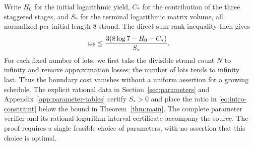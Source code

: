 Write $H_0$ for the initial logarithmic yield, $C_*$ for the contribution
of the three staggered stages, and $S_*$ for the terminal logarithmic
matrix volume, all normalized per initial length-$8$ strand.  The
direct-sum rank inequality then gives
\begin{equation}\label{eq:intro-constraint}
 \omega_\F\leq\frac{3(8\log7-H_0-C_*)}{S_*}.
\end{equation}
For each fixed number of lots, we first take the divisible strand count
$N$ to infinity and remove approximation losses; the number of lots
tends to infinity last.  Thus the boundary cost vanishes without a
uniform assertion for a growing schedule.  The explicit rational data
in Section~\ref{sec:parameters} and Appendix~\ref{app:parameter-tables}
certify $S_*>0$ and place the ratio in
\eqref{eq:intro-constraint} below the bound in Theorem~\ref{thm:main}.
The complete parameter verifier and its rational-logarithm interval
certificate accompany the source.  The proof requires a single feasible
choice of parameters, with no assertion that this choice is optimal.
